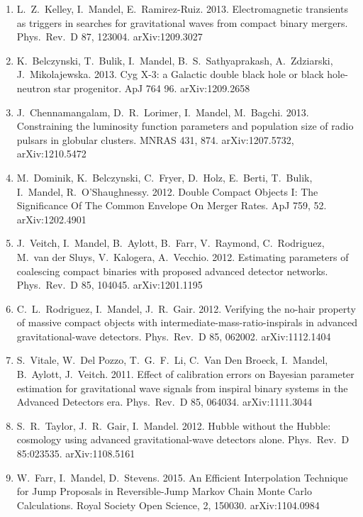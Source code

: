 \documentclass[margin,line]{res}
\begin{document}
\begin{resume}
\begin{enumerate}
\item  L.~Z.~Kelley, I.~Mandel, E.~Ramirez-Ruiz. 2013.  Electromagnetic transients as triggers in searches for gravitational waves from compact binary mergers. Phys.~Rev.~D 87, 123004.  arXiv:1209.3027

\item  K.~Belczynski, T.~Bulik, I.~Mandel, B.~S.~Sathyaprakash, A.~Zdziarski, J.~Mikolajewska. 2013. Cyg X-3: a Galactic double black hole or black hole-neutron star progenitor. ApJ 764 96. arXiv:1209.2658

\item  J.~Chennamangalam, D.~R.~Lorimer, I.~Mandel, M.~Bagchi.  2013. Constraining the luminosity function parameters and population size of radio pulsars in globular clusters.  MNRAS 431, 874.  arXiv:1207.5732, arXiv:1210.5472

\item  M.~Dominik, K.~Belczynski, C.~Fryer, D.~Holz, E.~Berti, T.~Bulik, I.~Mandel, R.~O'Shaughnessy.  2012.  Double Compact Objects I: The Significance Of The Common Envelope On Merger Rates.  ApJ 759, 52.  arXiv:1202.4901

\item  J.~Veitch, I.~Mandel, B.~Aylott, B.~Farr, V.~Raymond, C.~Rodriguez, M.~van der Sluys, V.~Kalogera, A.~Vecchio.  2012.  Estimating parameters of coalescing compact binaries with proposed advanced detector networks. Phys.~Rev.~D 85, 104045. arXiv:1201.1195

\item  C.~L.~Rodriguez, I.~Mandel, J.~R.~Gair.  2012. Verifying the no-hair property of massive compact objects with intermediate-mass-ratio-inspirals in advanced gravitational-wave detectors. Phys.~Rev.~D 85, 062002. arXiv:1112.1404

\item  S.~Vitale, W.~Del Pozzo, T.~G.~F.~Li, C.~Van Den Broeck, I.~Mandel, B.~Aylott, J.~Veitch.  2011.  Effect of calibration errors on Bayesian parameter estimation for gravitational wave signals from inspiral binary systems in the Advanced Detectors era.  Phys.~Rev.~D 85, 064034. arXiv:1111.3044
 
\item  S.~R.~Taylor, J.~R.~Gair, I.~Mandel. 2012. Hubble without the Hubble: cosmology using advanced gravitational-wave detectors alone. Phys.~Rev.~D 85:023535. arXiv:1108.5161 

\item  W.~Farr, I.~Mandel, D.~Stevens. 2015.  An Efficient Interpolation Technique for Jump Proposals in Reversible-Jump Markov Chain Monte Carlo Calculations.  Royal Society Open Science, 2, 150030. arXiv:1104.0984


\end{enumerate}
\end{resume}
\end{document}

